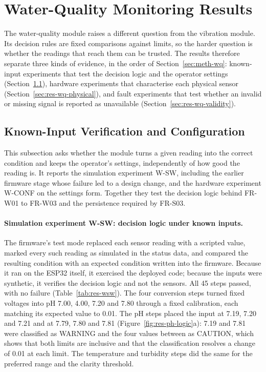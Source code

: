 \section{Water-Quality Monitoring Results}
\label{sec:results-water}

The water-quality module raises a different question from the vibration module. Its decision rules
are fixed comparisons against limits, so the harder question is whether the readings that reach them
can be trusted. The results therefore separate three kinds of evidence, in the order of
Section~\ref{sec:meth-wq}: known-input experiments that test the decision logic and the operator
settings (Section~\ref{sec:res-wq-logic}), hardware experiments that characterise each physical sensor
(Section~\ref{sec:res-wq-physical}), and fault experiments that test whether an invalid or missing
signal is reported as unavailable (Section~\ref{sec:res-wq-validity}).

\subsection{Known-Input Verification and Configuration}
\label{sec:res-wq-logic}

This subsection asks whether the module turns a given reading into the correct condition and keeps
the operator's settings, independently of how good the reading is. It reports the simulation
experiment W-SW, including the earlier firmware stage whose failure led to a design change, and the
hardware experiment W-CONF on the settings form. Together they test the decision logic behind FR-W01
to FR-W03 and the persistence required by FR-S03.

\paragraph{Simulation experiment W-SW: decision logic under known inputs.}
The firmware's test mode replaced each sensor reading with a scripted value, marked every such
reading as simulated in the status data, and compared the resulting condition with an expected
condition written into the firmware. Because it ran on the ESP32 itself, it exercised the deployed
code; because the inputs were synthetic, it verifies the decision logic and not the sensors. All 45
steps passed, with no failure (Table~\ref{tab:res-wsw}). The four conversion steps turned fixed
voltages into pH 7.00, 4.00, 7.20 and 7.80 through a fixed calibration, each matching its expected
value to 0.01. The pH steps placed the input at 7.19, 7.20 and 7.21 and at 7.79, 7.80 and 7.81
(Figure~\ref{fig:res-ph-logic}a): 7.19 and 7.81 were classified as WARNING and the four values
between as CAUTION, which shows that both limits are inclusive and that the classification resolves
a change of 0.01 at each limit. The temperature and turbidity steps did the same for the preferred
range and the clarity threshold.

